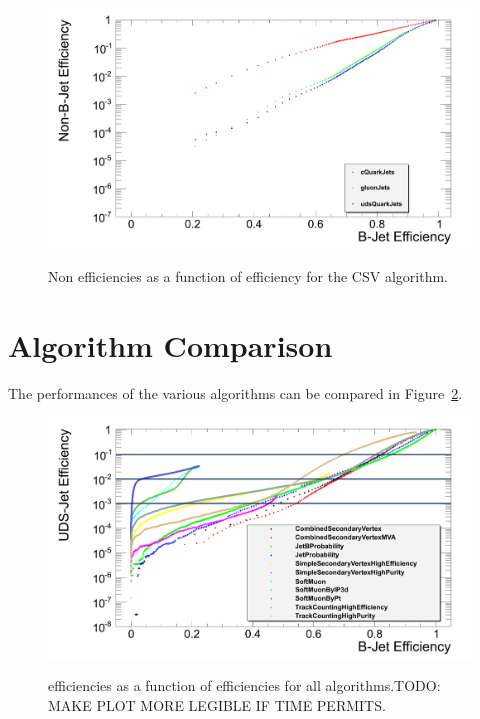 \begin{figure}[hbtp]
   \centering
     \includegraphics[width=\textwidth]{Chapters/04_Analysis/04a_BTags/Images/CombinedSecondaryVertex_nonBJetEfficiency_v_bJetEfficiency}\\
     \caption[Non \bjet efficiencies as a function of \bjet efficiency for the CSV algorithm.]{Non \bjet
     efficiencies as a function of \bjet efficiency for the CSV algorithm.}
     \label{fig:CSV_jet_efficiencies}
\end{figure}

\section{Algorithm Comparison}
\label{algorithm_comparison}

The performances of the various algorithms can be compared in Figure~\ref{fig:uds_eff_v_b_eff}.

\begin{figure}[hbtp]
   \centering
     \includegraphics[width=\textwidth]{Chapters/04_Analysis/04a_BTags/Images/udsJetEfficiency_v_bJetEfficiency_withLegend_wp}\\
     \caption[udsjet efficiencies as a function of \bjet efficiencies for all algorithms.]{\udsjet
     efficiencies as a function of \bjet efficiencies for all algorithms.TODO: MAKE PLOT MORE LEGIBLE IF TIME
     PERMITS.}%
     \label{fig:uds_eff_v_b_eff}
\end{figure}

